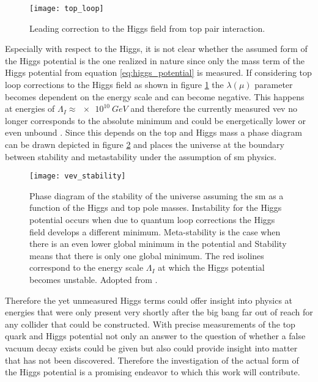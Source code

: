 \begin{figure}
    \centering
    \texttt{[image: top\_loop]}
        \caption[]{Leading correction to the Higgs field from top pair interaction.}
    \label{fig:top_loop}    
\end{figure}
Especially with respect to the Higgs, it is not clear whether the assumed form of the Higgs potential is the one realized in nature since only the mass term of the Higgs potential from equation \ref{eq:higgs_potential} is measured. If considering top loop corrections to the Higgs field as shown in figure \ref{fig:top_loop} the $\lambda(\mu)$ parameter becomes dependent on the energy scale and can become negative. This happens at energies of $\Lambda_I\approx \qty[]{e10}{GeV}$ and therefore the currently measured \ac{vev} no longer corresponds to the absolute minimum and could be energetically lower or even unbound \citep{devoto2022false}. Since this depends on the top and Higgs mass a phase diagram can be drawn depicted in figure \ref{fig:vev_stability} and places the universe at the boundary between stability and metastability under the assumption of \ac{sm} physics.

\begin{figure}
    \centering
    \texttt{[image: vev\_stability]}
    \caption[]{Phase diagram of the stability of the universe assuming the \ac{sm} as a function of the Higgs and top pole masses. Instability for the Higgs potential occurs when due to quantum loop corrections the Higgs field develops a different minimum. Meta-stability is the case when there is an even lower global minimum in the potential and Stability means that there is only one global minimum. The red isolines correspond to the energy scale $\Lambda_I$ at which the Higgs potential becomes unstable. Adopted from \citep{Buttazzo:2013uya}.} 
    \label{fig:vev_stability}
\end{figure}

Therefore the yet unmeasured Higgs terms could offer insight into physics at energies that were only present very shortly after the big bang far out of reach for any collider that could be constructed. With precise measurements of the top quark and Higgs potential not only an answer to  the question of whether a false vacuum decay exists could be given but also could provide insight into matter that has not been discovered. Therefore the investigation of the actual form of the Higgs potential is a promising endeavor to which this work will contribute.

